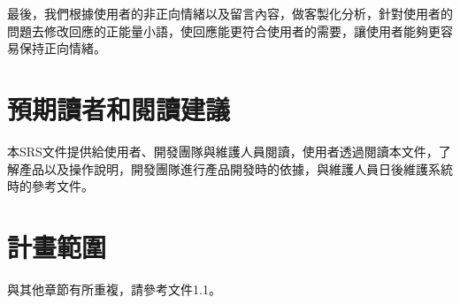 \documentclass[12pt]{scrreprt}
\begin{document}
最後，我們根據使用者的非正向情緒以及留言內容，做客製化分析，針對使用者的問題去修改回應的正能量小語，使回應能更符合使用者的需要，讓使用者能夠更容易保持正向情緒。


\section{預期讀者和閱讀建議}

本SRS文件提供給使用者、開發團隊與維護人員閱讀，使用者透過閱讀本文件，了解產品以及操作說明，開發團隊進行產品開發時的依據，與維護人員日後維護系統時的參考文件。

\section{計畫範圍}
與其他章節有所重複，請參考文件1.1。

\end{document}
